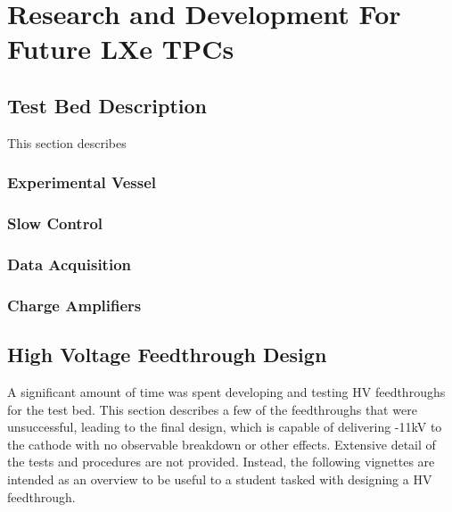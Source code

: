 \chapter{Research and Development For Future LXe TPCs}

\label{ch:RandD} %

\section{Test Bed Description}
This section describes 
\subsection{Experimental Vessel}

\subsection{Slow Control}
\subsection{Data Acquisition}
\subsection{Charge Amplifiers}

\section{High Voltage Feedthrough Design}
A significant amount of time was spent developing and testing \ac{HV} feedthroughs for the test bed. This section describes a few of the feedthroughs that were unsuccessful, leading to the final design, which is capable of delivering -11kV to the cathode with no observable breakdown or other effects. Extensive detail of the tests and procedures are not provided. Instead, the following vignettes are intended as an overview to be useful to a student tasked with designing a HV feedthrough. 

